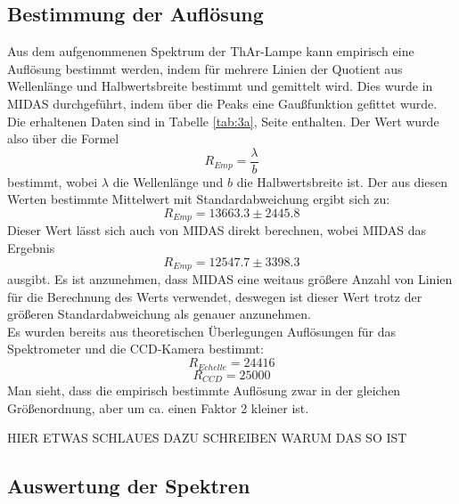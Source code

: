 \subsection{Bestimmung der Auflösung}
Aus dem aufgenommenen Spektrum der ThAr-Lampe kann empirisch eine Auflösung bestimmt werden, indem für mehrere Linien der Quotient aus Wellenlänge und Halbwertsbreite bestimmt und gemittelt wird. Dies wurde in MIDAS durchgeführt, indem über die Peaks eine Gaußfunktion gefittet wurde. Die erhaltenen Daten sind in Tabelle \ref{tab:3a}, Seite  \pageref{tab:3a} enthalten. Der Wert wurde also über die Formel
\begin{equation}
R_{Emp} = \frac{\lambda}{b}
\end{equation}
bestimmt, wobei $\lambda$ die Wellenlänge und $b$ die Halbwertsbreite ist. Der aus diesen Werten bestimmte Mittelwert mit Standardabweichung ergibt sich zu:
\begin{equation}
R_{Emp} = 13663.3 \pm 2445.8
\end{equation}
Dieser Wert lässt sich auch von MIDAS direkt berechnen, wobei MIDAS das Ergebnis
\begin{equation}
R_{Emp} = 12547.7 \pm 3398.3
\end{equation}
ausgibt. Es ist anzunehmen, dass MIDAS eine weitaus größere Anzahl von Linien für die Berechnung des Werts verwendet, deswegen ist dieser Wert trotz der größeren Standardabweichung als genauer anzunehmen.
\\
Es wurden bereits aus theoretischen Überlegungen Auflösungen für das Spektrometer und die CCD-Kamera bestimmt:
\begin{equation}
R_{Echelle} = 24416
\end{equation}
\begin{equation}
R_{CCD} =  25000
\end{equation}
Man sieht, dass die empirisch bestimmte Auflösung zwar in der gleichen Größenordnung, aber um ca. einen Faktor 2 kleiner ist.

HIER ETWAS SCHLAUES DAZU SCHREIBEN WARUM DAS SO IST

\subsection{Auswertung der Spektren}
